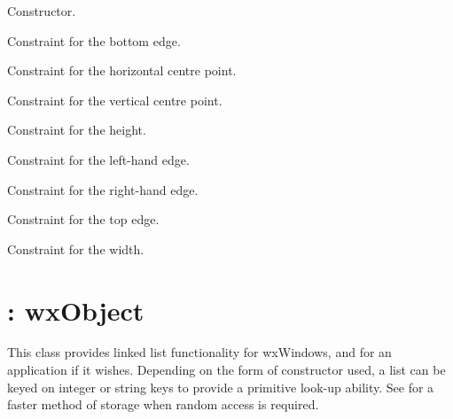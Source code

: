 
Constructor.



Constraint for the bottom edge.



Constraint for the horizontal centre point.



Constraint for the vertical centre point.



Constraint for the height.



Constraint for the left-hand edge.



Constraint for the right-hand edge.



Constraint for the top edge.



Constraint for the width.

\section{: wxObject}\label{wxlist}

This class provides linked list functionality for wxWindows, and for an application
if it wishes.  Depending on the form of constructor used, a list can be keyed on
integer or string keys to provide a primitive look-up ability. See \rtfsp
for a faster method of storage when random access is required.

